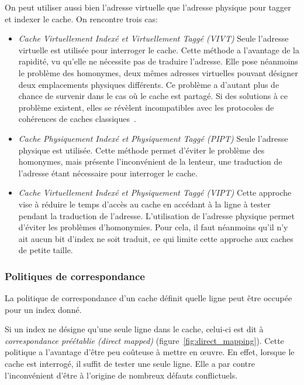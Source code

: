 On peut utiliser aussi bien l'adresse virtuelle que l'adresse physique pour tagger et indexer le cache.
On rencontre trois cas:
\begin{itemize}
	\item \emph{Cache Virtuellement Indexé et Virtuellement Taggé (VIVT)}
	Seule l'adresse virtuelle est utilisée pour interroger le cache.
	Cette méthode a l'avantage de la rapidité, vu qu'elle ne nécessite pas de traduire l'adresse.
	Elle pose néanmoins le problème des homonymes, deux mêmes adresses virtuelles pouvant désigner deux emplacements physiques différents.
	Ce problème a d'autant plus de chance de survenir dans le cas où le cache est partagé.
	Si des solutions à ce problème existent, elles se révèlent incompatibles avec les protocoles de cohérences de caches classiques~\cite{Kaxiras:2013:NPE:2485922.2485968}.

	\item \emph{Cache Physiquement Indexé et Physiquement Taggé (PIPT)}
	Seule l'adresse physique est utilisée.
	Cette méthode permet d'éviter le problème des homonymes, mais présente l'inconvénient de la lenteur, une traduction de l'adresse étant nécessaire pour interroger le cache.

	\item \emph{Cache Virtuellement Indexé et Physiquement Taggé (VIPT)}
	Cette approche vise à réduire le temps d'accès au cache en accédant à la ligne à tester pendant la traduction de l'adresse.
	L'utilisation de l'adresse physique permet d'éviter les problèmes d'homonymies.
	Pour cela, il faut néanmoins qu'il n'y ait aucun bit d'index ne soit traduit, ce qui limite cette approche aux caches de petite taille.
\end{itemize}

\subsubsection{Politiques de correspondance}

La politique de correspondance d'un cache définit quelle ligne peut être occupée pour un index donné.

Si un index ne désigne qu'une seule ligne dans le cache, celui-ci est dit à \emph{correspondance préétablie (direct mapped)} (figure~\ref{fig:direct_mapping}).
Cette politique a l'avantage d'être peu coûteuse à mettre en œuvre.
En effet, lorsque le cache est interrogé, il suffit de tester une seule ligne.
Elle a par contre l'inconvénient d'être à l'origine de nombreux défauts conflictuels.

